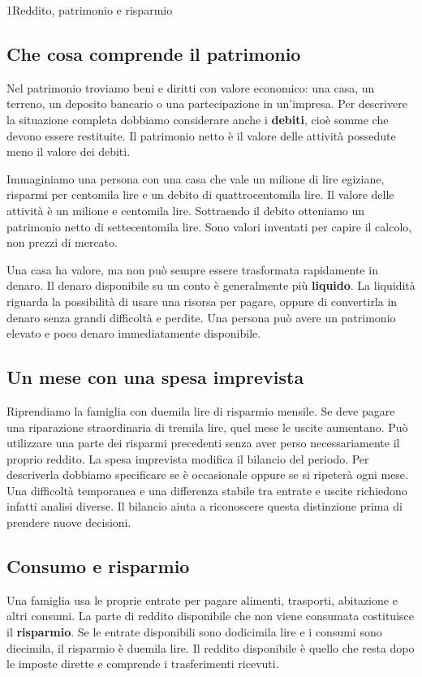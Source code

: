 \begin{lettura}{1}{Reddito, patrimonio e risparmio}
\subsection*{Che cosa comprende il patrimonio}
Nel patrimonio troviamo beni e diritti con valore economico: una casa, un terreno, un deposito bancario o una partecipazione in un'impresa. Per descrivere la situazione completa dobbiamo considerare anche i \textbf{debiti}, cioè somme che devono essere restituite. Il patrimonio netto è il valore delle attività possedute meno il valore dei debiti.

Immaginiamo una persona con una casa che vale un milione di lire egiziane, risparmi per centomila lire e un debito di quattrocentomila lire. Il valore delle attività è un milione e centomila lire. Sottraendo il debito otteniamo un patrimonio netto di settecentomila lire. Sono valori inventati per capire il calcolo, non prezzi di mercato.

Una casa ha valore, ma non può sempre essere trasformata rapidamente in denaro. Il denaro disponibile su un conto è generalmente più \textbf{liquido}. La liquidità riguarda la possibilità di usare una risorsa per pagare, oppure di convertirla in denaro senza grandi difficoltà e perdite. Una persona può avere un patrimonio elevato e poco denaro immediatamente disponibile.

\subsection*{Un mese con una spesa imprevista}
Riprendiamo la famiglia con duemila lire di risparmio mensile. Se deve pagare una riparazione straordinaria di tremila lire, quel mese le uscite aumentano. Può utilizzare una parte dei risparmi precedenti senza aver perso necessariamente il proprio reddito. La spesa imprevista modifica il bilancio del periodo. Per descriverla dobbiamo specificare se è occasionale oppure se si ripeterà ogni mese. Una difficoltà temporanea e una differenza stabile tra entrate e uscite richiedono infatti analisi diverse. Il bilancio aiuta a riconoscere questa distinzione prima di prendere nuove decisioni.

\subsection*{Consumo e risparmio}
Una famiglia usa le proprie entrate per pagare alimenti, trasporti, abitazione e altri consumi. La parte di reddito disponibile che non viene consumata costituisce il \textbf{risparmio}. Se le entrate disponibili sono dodicimila lire e i consumi sono diecimila, il risparmio è duemila lire. Il reddito disponibile è quello che resta dopo le imposte dirette e comprende i trasferimenti ricevuti.


\end{lettura}
